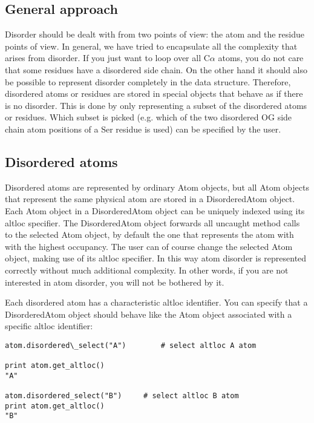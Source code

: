 \documentclass{report}
\begin{document}
\subsection{General approach\label{disorder problems}}

Disorder should be dealt with from two points of view: the atom and the residue
points of view. In general, we have tried to encapsulate all the complexity that
arises from disorder. If you just want to loop over all C\( \alpha  \) atoms,
you do not care that some residues have a disordered side chain. On the other
hand it should also be possible to represent disorder completely in the data
structure. Therefore, disordered atoms or residues are stored in special objects
that behave as if there is no disorder. This is done by only representing a
subset of the disordered atoms or residues. Which subset is picked (e.g. which
of the two disordered OG side chain atom positions of a Ser residue is used)
can be specified by the user.

\subsection{Disordered atoms\label{disordered atoms}}

Disordered atoms are represented by ordinary Atom objects, but all Atom objects
that represent the same physical atom are stored in a DisorderedAtom object.
Each Atom object in a DisorderedAtom object can be uniquely indexed using its
altloc specifier. The DisorderedAtom object forwards all uncaught method calls
to the selected Atom object, by default the one that represents the atom with
with the highest occupancy. The user can of course change the selected Atom
object, making use of its altloc specifier. In this way atom disorder is represented
correctly without much additional complexity. In other words, if you are not
interested in atom disorder, you will not be bothered by it.

Each disordered atom has a characteristic altloc identifier. You can specify
that a DisorderedAtom object should behave like the Atom object associated with
a specific altloc identifier:

\begin{verbatim}
atom.disordered\_select("A")		# select altloc A atom

print atom.get_altloc()
"A"

atom.disordered_select("B")	   	# select altloc B atom
print atom.get_altloc()
"B"
\end{verbatim}
\end{document}
